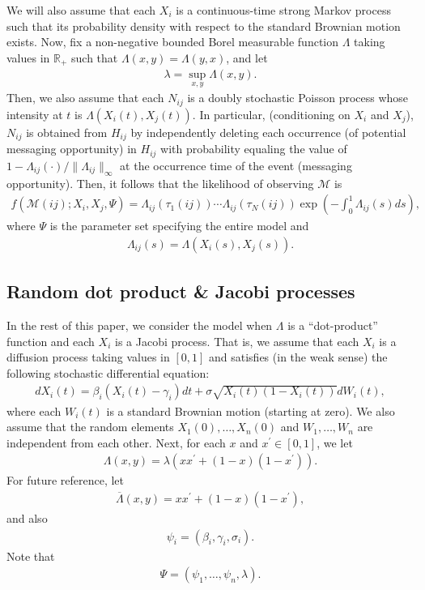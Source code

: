 \documentclass[12pt]{article}%
\begin{document}
We will also assume that each $X_i$ is a continuous-time strong Markov process 
such that its probability density with respect to the standard Brownian motion
exists.  
Now, fix a non-negative bounded Borel measurable function $\Lambda$ taking values in $\mathbb R_+$ such that $\Lambda(x,y) = \Lambda(y,x)$, and let
\begin{eqnarray}
\lambda = \sup_{x,y} \Lambda(x,y).
\end{eqnarray}
Then, we also assume that each $N_{ij}$ is a doubly stochastic Poisson process whose intensity at $t$  is 
$\Lambda(X_i(t),X_j(t))$.  
In particular, (conditioning on $X_i$ and $X_j$), $N_{ij}$ is obtained from $H_{ij}$ by independently deleting each occurrence (of potential messaging opportunity) in $H_{ij}$ with probability equaling the value of $1-\Lambda_{ij}(\cdot)/\|\Lambda_{ij}\|_\infty$ at the occurrence time of the event (messaging opportunity). 
Then, it follows that the likelihood of observing $\mathcal M$ is 
\begin{eqnarray}
f(\mathcal M(ij) ;X_i, X_j, \Psi) =  \Lambda_{ij}(\tau_1(ij)) \cdots \Lambda_{ij}(\tau_N(ij)) \exp\left(-\int_0^1 \Lambda_{ij}(s) ds\right),
\end{eqnarray}
where $\Psi$ is the parameter set specifying the entire model and 
\begin{eqnarray}
\Lambda_{ij}(s) = \Lambda(X_i(s),X_j(s)).
\end{eqnarray}  

\subsection{Random dot product \& Jacobi processes}
In the rest of this paper, we consider the model when $\Lambda$ is a ``dot-product'' function
and each $X_i$ is a Jacobi process.  That is, we assume that each $X_i$ is a diffusion 
process taking values in $[0,1]$ and satisfies (in the weak sense)
the following stochastic differential equation:
\begin{eqnarray}
dX_i(t) = \beta_i(X_i(t) - \gamma_i) dt + \sigma \sqrt{X_i(t) (1-X_i(t))} dW_i(t), 
\end{eqnarray}
where each $W_i(t)$ is a standard Brownian motion (starting at zero).  We also assume that the random elements $X_1(0),\ldots, X_n(0)$ and $W_1,\ldots, W_n$ are independent from each other.  Next, for each $x$ and $x^\prime \in [0,1]$, we let 
\begin{eqnarray}
\Lambda(x,y) = \lambda (x x^\prime + (1-x) (1-x^\prime)).
\end{eqnarray}
For future reference, let
\begin{eqnarray}
\overline{\Lambda}(x,y) = x x^\prime + (1-x) (1-x^\prime),
\end{eqnarray}
and also
\begin{eqnarray}
\psi_i = (\beta_i,\gamma_i,\sigma_i). 
\end{eqnarray}
Note that 
\begin{eqnarray}
\Psi = (\psi_1,\ldots, \psi_n,\lambda).
\end{eqnarray}
\end{document}
